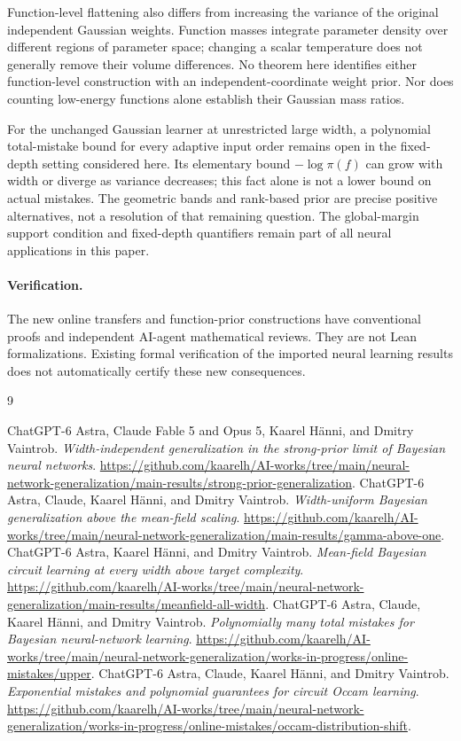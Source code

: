 \documentclass[11pt]{article}
\begin{document}
Function-level flattening also differs from increasing the variance of
the original independent Gaussian weights. Function masses integrate
parameter density over different regions of parameter space; changing a
scalar temperature does not generally remove their volume differences.
No theorem here identifies either function-level construction with an
independent-coordinate weight prior. Nor does counting low-energy
functions alone establish their Gaussian mass ratios.

For the unchanged Gaussian learner at unrestricted large width, a
polynomial total-mistake bound for every adaptive input order remains
open in the fixed-depth setting considered here. Its elementary
bound $-\log\pi(f)$ can grow with width or diverge as variance decreases;
this fact alone is not a lower bound on actual mistakes. The geometric
bands and rank-based prior are precise positive alternatives, not a
resolution of that remaining question. The global-margin support
condition and fixed-depth quantifiers remain part of all neural
applications in this paper.

\paragraph{Verification.}
The new online transfers and function-prior constructions have
conventional proofs and independent AI-agent mathematical reviews.
They are not Lean formalizations. Existing formal verification of the
imported neural learning results does not automatically certify these
new consequences.

\begin{thebibliography}{9}
\raggedright
{} ChatGPT-6 Astra, Claude Fable 5 and Opus 5, Kaarel H\"anni, and Dmitry Vaintrob.
\emph{Width-independent generalization in the strong-prior limit of Bayesian neural networks}.
\url{https://github.com/kaarelh/AI-works/tree/main/neural-network-generalization/main-results/strong-prior-generalization}.
 ChatGPT-6 Astra, Claude, Kaarel H\"anni, and Dmitry Vaintrob.
\emph{Width-uniform Bayesian generalization above the mean-field scaling}.
\url{https://github.com/kaarelh/AI-works/tree/main/neural-network-generalization/main-results/gamma-above-one}.
 ChatGPT-6 Astra, Kaarel H\"anni, and Dmitry Vaintrob.
\emph{Mean-field Bayesian circuit learning at every width above target complexity}.
\url{https://github.com/kaarelh/AI-works/tree/main/neural-network-generalization/main-results/meanfield-all-width}.
 ChatGPT-6 Astra, Claude, Kaarel H\"anni, and Dmitry Vaintrob.
\emph{Polynomially many total mistakes for Bayesian neural-network learning}.
\url{https://github.com/kaarelh/AI-works/tree/main/neural-network-generalization/works-in-progress/online-mistakes/upper}.
 ChatGPT-6 Astra, Claude, Kaarel H\"anni, and Dmitry Vaintrob.
\emph{Exponential mistakes and polynomial guarantees for circuit Occam learning}.
\url{https://github.com/kaarelh/AI-works/tree/main/neural-network-generalization/works-in-progress/online-mistakes/occam-distribution-shift}.
\end{thebibliography}
\end{document}
